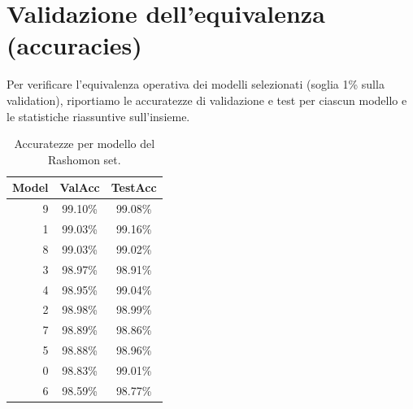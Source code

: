 \documentclass[12pt,a4paper,oneside]{report}
\numberwithin{figure}{chapter}
\numberwithin{table}{chapter}
\begin{document}
\section{Validazione dell’equivalenza (accuracies)}
\label{sec:rashomon_equivalenza}

Per verificare l’equivalenza operativa dei modelli selezionati (soglia 1\%
sulla validation), riportiamo le accuratezze di validazione e test per ciascun
modello e le statistiche riassuntive sull’insieme.

\begin{table}[H]
      \centering
      \begin{minipage}{0.90\linewidth}
            \centering
            \renewcommand{\arraystretch}{1.1}
            \setlength{\tabcolsep}{6pt}
            \begin{tabular}{rcc}
                  \hline
                  \textbf{Model} & \textbf{ValAcc} & \textbf{TestAcc} \\
                  \hline
                  9              & 99.10\%         & 99.08\%          \\
                  1              & 99.03\%         & 99.16\%          \\
                  8              & 99.03\%         & 99.02\%          \\
                  3              & 98.97\%         & 98.91\%          \\
                  4              & 98.95\%         & 99.04\%          \\
                  2              & 98.98\%         & 98.99\%          \\
                  7              & 98.89\%         & 98.86\%          \\
                  5              & 98.88\%         & 98.96\%          \\
                  0              & 98.83\%         & 99.01\%          \\
                  6              & 98.59\%         & 98.77\%          \\
                  \hline
            \end{tabular}
            \caption{Accuratezze per modello del Rashomon set.}
            \label{tab:rashomon_acc_by_model}
      \end{minipage}
\end{table}
\end{document}
